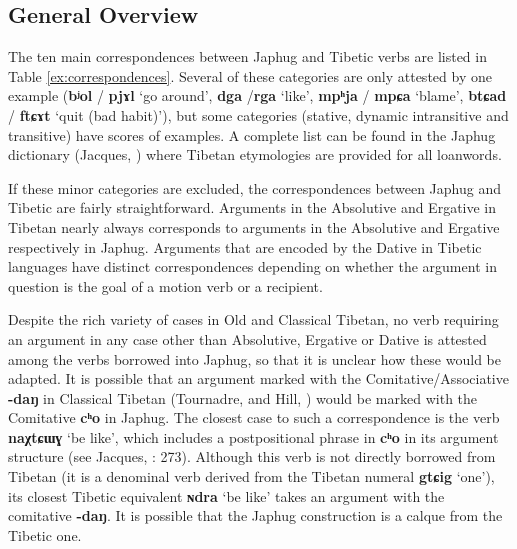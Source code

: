 \documentclass[oneside,a4paper,11pt]{article}
\newcommand{\ipa}[1]{{\phon\textbf{\mbox{#1}}}} %
\begin{document}
\subsection{General Overview}
The ten main correspondences between Japhug and Tibetic verbs are listed in Table \ref{ex:correspondences}. Several of these categories are only attested by one example (\ipa{bʲol} / \ipa{pjɤl} `go around', \ipa{dga} /\ipa{rga} `like', \ipa{mpʰja} / \ipa{mpɕa} `blame', \ipa{btɕad} / \ipa{ftɕɤt} `quit (bad habit)'), but some categories (stative, dynamic intransitive and transitive) have scores of examples. A complete list can be found in the Japhug dictionary (Jacques, \citeyear{jacques15japhug}) where Tibetan etymologies are provided for all loanwords.

If these minor categories are excluded, the correspondences between Japhug and Tibetic are fairly straightforward. Arguments in the Absolutive and Ergative in Tibetan nearly always corresponds to arguments in the Absolutive and Ergative respectively in Japhug. Arguments that are encoded by the Dative in Tibetic languages have distinct correspondences depending on whether the argument in question is the goal of a motion verb or a recipient.

Despite the rich variety of cases in Old and Classical Tibetan, no verb requiring an argument in any case other than Absolutive, Ergative or Dative is attested among the verbs borrowed into Japhug, so that it is unclear how these would be adapted. It is possible that an argument marked with the Comitative/Associative \ipa{-daŋ} in Classical Tibetan (Tournadre, \citeyear{tournadre10cases} and Hill, \citeyear{hill12bas}) would be marked with the Comitative \ipa{cʰo} in Japhug. The closest case to such a correspondence is the verb \ipa{naχtɕɯɣ} `be like', which includes a postpositional phrase in \ipa{cʰo} in its argument structure (see Jacques, \citeyear{jacques14linking}: 273). Although this verb is not directly borrowed from Tibetan (it is a denominal verb derived from the Tibetan numeral \ipa{gtɕig} `one'), its closest Tibetic equivalent \ipa{ɴdra} `be like' takes an argument with the comitative \ipa{-daŋ}. It is possible that the Japhug construction is a calque from the Tibetic one.
\end{document}
